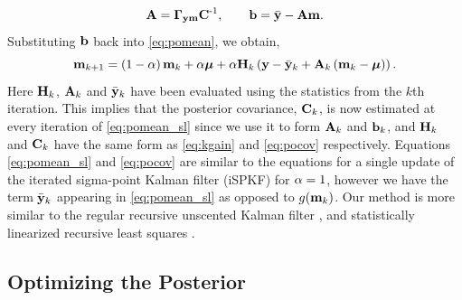 \documentclass{article} %
\begin{document}
\begin{equation}
    \mathbf{A} = \boldsymbol\Gamma_{\mathbf{y}\mathbf{m}} \mathbf{C}^{\text{-}1}, \qquad
    \mathbf{b} = \bar{\mathbf{y}} - \mathbf{A}\mathbf{m}.
\end{equation}
Substituting $\mathbf{b}$ back into \eqref{eq:pomean}, we obtain, 
\begin{equation}
    \mathbf{m}_{k+1} = \left({1-\alpha}\right)\mathbf{m}_k + \alpha\boldsymbol{\mu} 
        + \alpha\mathbf{H}_k\left({\mathbf{y} - \bar{\mathbf{y}}_k 
        + \mathbf{A}_k\left({\mathbf{m}_k - \boldsymbol{\mu}}\right)}\right).
    \label{eq:pomean_sl}
\end{equation}
Here $\mathbf{H}_k$, $\mathbf{A}_k$ and $\bar{\mathbf{y}}_k$ have been evaluated using the
statistics from the $k$th iteration. This implies that the posterior
covariance, $\mathbf{C}_k$, is now estimated at every iteration of
\eqref{eq:pomean_sl} since we use it to form $\mathbf{A}_k$ and $\mathbf{b}_k$, and 
$\mathbf{H}_k$ and $\mathbf{C}_k$ have the same form as \eqref{eq:kgain} and
\eqref{eq:pocov} respectively. Equations \eqref{eq:pomean_sl} and
\eqref{eq:pocov} are similar to the equations for a single update of the
iterated sigma-point Kalman filter (iSPKF) \cite{Sibley2006} for $\alpha = 1$,
however we have the term $\bar{\mathbf{y}}_k$ appearing in \eqref{eq:pomean_sl} as
opposed to $g\!\left({{\mathbf{m}_k}}\right)$. Our method is more similar to the regular
recursive unscented Kalman filter \cite{Julier2004}, and statistically 
linearized recursive least squares \cite{Geist2010}.


\subsection{Optimizing the Posterior}
\end{document}
